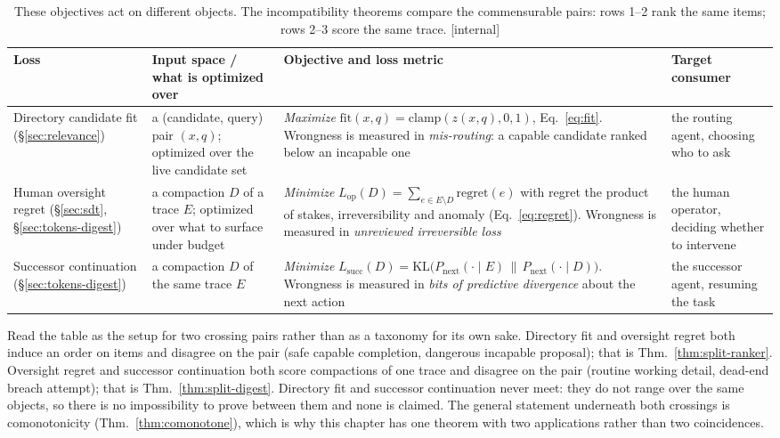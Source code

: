 \documentclass[11pt,a4paper]{article}
\theoremstyle{definition}
\theoremstyle{plain}
\begin{document}
\begin{table}[H]
\centering
\caption{These objectives act on different objects. The incompatibility theorems compare the commensurable pairs: rows 1--2 rank the same items; rows 2--3 score the same trace. [internal]}
\label{tab:ls-three-losses}
\small
\renewcommand{\arraystretch}{1.3}
\begin{tabularx}{\linewidth}{@{}p{} >{\raggedright\arraybackslash}X >{\raggedright\arraybackslash}X >{\raggedright\arraybackslash}p{}@{}}
\toprule
\textbf{Loss} & \textbf{Input space / what is optimized over} & \textbf{Objective and loss metric} & \textbf{Target consumer} \\
\midrule
Directory candidate fit \newline (\S\ref{sec:relevance})
& a (candidate, query) pair $(x,q)$; optimized over the live candidate set
& \emph{Maximize} $\mathrm{fit}(x,q)=\mathrm{clamp}(z(x,q),0,1)$,
Eq.~\ref{eq:fit}. Wrongness is measured in \emph{mis-routing}: a capable
candidate ranked below an incapable one
& the routing agent, choosing who to ask \\
Human oversight regret \newline (\S\ref{sec:sdt}, \S\ref{sec:tokens-digest})
& a compaction $D$ of a trace $E$; optimized over what to surface under budget
& \emph{Minimize} $L_{\mathrm{op}}(D)=\sum_{e\in E\setminus D}\mathrm{regret}(e)$
with regret the product of stakes, irreversibility and anomaly
(Eq.~\ref{eq:regret}). Wrongness is measured in \emph{unreviewed
irreversible loss}
& the human operator, deciding whether to intervene \\
Successor continuation \newline (\S\ref{sec:tokens-digest})
& a compaction $D$ of the same trace $E$
& \emph{Minimize}
$L_{\mathrm{succ}}(D)=\mathrm{KL}\bigl(P_{\mathrm{next}}(\cdot\mid E)\,\|\,P_{\mathrm{next}}(\cdot\mid D)\bigr)$.
Wrongness is measured in \emph{bits of predictive divergence} about the next
action
& the successor agent, resuming the task \\
\bottomrule
\end{tabularx}
\end{table}

\noindent Read the table as the setup for two crossing pairs rather than as a
taxonomy for its own sake. Directory fit and oversight regret both induce an
order on items and disagree on the pair (safe capable completion, dangerous
incapable proposal); that is Thm.~\ref{thm:split-ranker}. Oversight regret and
successor continuation both score compactions of one trace and disagree on the
pair (routine working detail, dead-end breach attempt); that is
Thm.~\ref{thm:split-digest}. Directory fit and successor continuation never
meet: they do not range over the same objects, so there is no impossibility to prove
between them and none is claimed. The general statement underneath both
crossings is comonotonicity (Thm.~\ref{thm:comonotone}), which is why this
chapter has one theorem with two applications rather than two coincidences.
\end{document}
